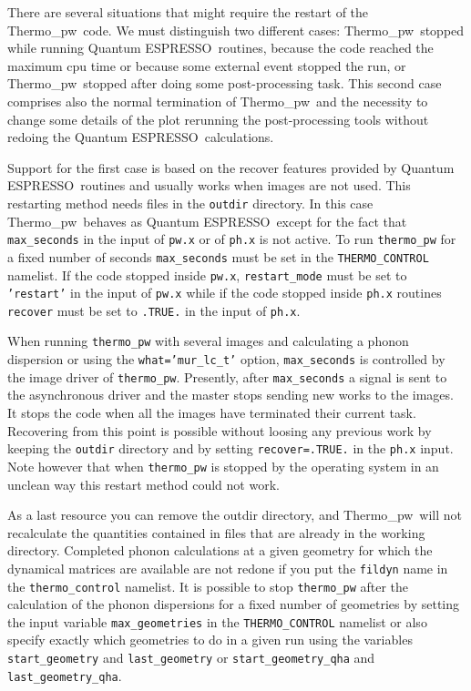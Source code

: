 \documentclass[12pt,a4paper,twoside]{report}
\def\qe{{\sc Quantum ESPRESSO}}
\def\thermo{{\sc Thermo}\_{\sc pw}}
\begin{document}
There are several situations that might require the restart of the \thermo\ 
code. We must distinguish two different cases:
\thermo\ stopped while running \qe\ routines, because the code reached
the maximum cpu time or because some external event stopped the run,
or \thermo\ stopped after doing some post-processing task. This second 
case comprises also the normal termination of
\thermo\ and the necessity to change some details of the plot rerunning
the post-processing tools without redoing the \qe\ calculations.

Support for the first case is based on the recover features provided by 
\qe\ routines and usually works when images are not used. This restarting 
method needs files in the \texttt{outdir}
directory. In this case \thermo\ behaves as \qe\ 
except for the fact that \texttt{max\_seconds} in the input of \texttt{pw.x} or
of \texttt{ph.x} is not active. To run \texttt{thermo\_pw}
for a fixed number of seconds \texttt{max\_seconds} must be set in the
\texttt{THERMO\_CONTROL} namelist. If the code stopped inside \texttt{pw.x},
\texttt{restart\_mode} must be set to \texttt{'restart'} in the input of 
\texttt{pw.x} while if the code stopped inside \texttt{ph.x} routines
\texttt{recover} must be set to \texttt{.TRUE.} in the input of \texttt{ph.x}.

When running \texttt{thermo\_pw} with several images and
calculating a phonon dispersion or using the \texttt{what='mur\_lc\_t'}
option, \texttt{max\_seconds} is controlled by the image driver of 
\texttt{thermo\_pw}. Presently, after \texttt{max\_seconds} a signal
is sent to the asynchronous driver and the master stops sending new works 
to the images. It stops the code when all the images have terminated their
current task. Recovering from this point is possible without loosing 
any previous work by keeping the \texttt{outdir} directory and by setting 
\texttt{recover=.TRUE.} in the \texttt{ph.x} input.
Note however that when \texttt{thermo\_pw} is stopped by the operating 
system in an unclean way this restart method could not work.

As a last resource you can remove the outdir directory, and \thermo\ 
will not recalculate the quantities contained in files that are already 
in the working directory. Completed phonon calculations at a given
geometry for which the dynamical matrices are available are
not redone if you put the \texttt{fildyn} name in the 
\texttt{thermo\_control} namelist. It is possible to stop 
\texttt{thermo\_pw} after the 
calculation of the phonon dispersions for a fixed number of geometries 
by setting the input variable \texttt{max\_geometries} in the 
\texttt{THERMO\_CONTROL} namelist or also specify exactly which geometries
to do in a given run using the variables \texttt{start\_geometry} and
\texttt{last\_geometry} or \texttt{start\_geometry\_qha} and 
\texttt{last\_geometry\_qha}. 
\end{document}
